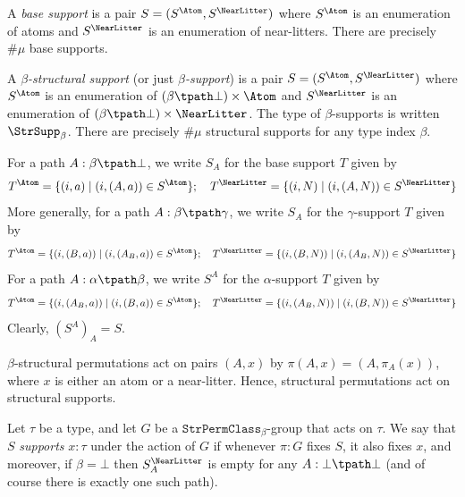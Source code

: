 \begin{definition}
  \label{def:BaseSupport}
  \leanok
  A \emph{base support} is a pair \( S = (S^\Atom, S^\NearLitter) \) where \( S^\Atom \) is an enumeration of atoms and \( S^\NearLitter \) is an enumeration of near-litters.
  There are precisely \( \#\mu \) base supports.
\end{definition}
\begin{definition}
  \label{def:StrSupport}
  \leanok
  A \emph{\( \beta \)-structural support} (or just \emph{\( \beta \)-support}) is a pair \( S = (S^\Atom, S^\NearLitter) \) where \( S^\Atom \) is an enumeration of \( (\beta \tpath \bot) \times \Atom \) and \( S^\NearLitter \) is an enumeration of \( (\beta \tpath \bot) \times \NearLitter \).
  The type of \( \beta \)-supports is written \( \StrSupp_\beta \).
  There are precisely \( \#\mu \) structural supports for any type index \( \beta \).

  For a path \( A : \beta \tpath \bot \), we write \( S_A \) for the base support \( T \) given by
  \[ T^\Atom = \{ (i, a) \mid (i, (A, a)) \in S^\Atom \};\quad T^\NearLitter = \{ (i, N) \mid (i, (A, N)) \in S^\NearLitter \} \]
  More generally, for a path \( A : \beta \tpath \gamma \), we write \( S_A \) for the \( \gamma \)-support \( T \) given by
  \[ T^\Atom = \{ (i, (B, a)) \mid (i, (A_B, a)) \in S^\Atom \};\quad T^\NearLitter = \{ (i, (B, N)) \mid (i, (A_B, N)) \in S^\NearLitter \} \]
  For a path \( A : \alpha \tpath \beta \), we write \( S^A \) for the \( \alpha \)-support \( T \) given by
  \[ T^\Atom = \{ (i, (A_B, a)) \mid (i, (B, a)) \in S^\Atom \};\quad T^\NearLitter = \{ (i, (A_B, N)) \mid (i, (B, N)) \in S^\NearLitter \} \]
  Clearly, \( (S^A)_A = S \).

  \( \beta \)-structural permutations act on pairs \( (A, x) \) by \( \pi(A, x) = (A, \pi_A(x)) \), where \( x \) is either an atom or a near-litter.
  Hence, structural permutations act on structural supports.

  Let \( \tau \) be a type, and let \( G \) be a \( \texttt{StrPermClass}_\beta \)-group that acts on \( \tau \).
  We say that \( S \) \emph{supports} \( x : \tau \) under the action of \( G \) if whenever \( \pi : G \) fixes \( S \), it also fixes \( x \), and moreover, if \( \beta = \bot \) then \( S_A^\NearLitter \) is empty for any \( A : \bot \tpath \bot \) (and of course there is exactly one such path).
\end{definition}
